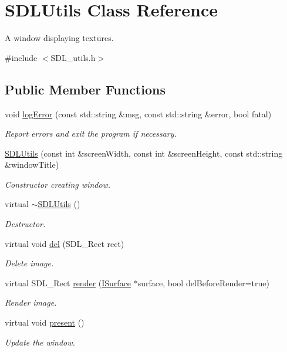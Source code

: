 \hypertarget{class_s_d_l_utils}{}\section{S\+D\+L\+Utils Class Reference}
\label{class_s_d_l_utils}


A window displaying textures.  




{\ttfamily \#include $<$S\+D\+L\+\_\+utils.\+h$>$}

\subsection*{Public Member Functions}
\begin{DoxyCompactItemize}
\item 
void \mbox{\hyperlink{class_s_d_l_utils_ad74f19327d940a7fea1a8178d81768e7}{log\+Error}} (const std\+::string \&msg, const std\+::string \&error, bool fatal)
\begin{DoxyCompactList}\small\item\em Report errors and exit the program if necessary. \end{DoxyCompactList}\item 
\mbox{\hyperlink{class_s_d_l_utils_a53e5b8a0018c3d96af3ad413b2272f3d}{S\+D\+L\+Utils}} (const int \&screen\+Width, const int \&screen\+Height, const std\+::string \&window\+Title)
\begin{DoxyCompactList}\small\item\em Constructor creating window. \end{DoxyCompactList}\item 
virtual \mbox{\hyperlink{class_s_d_l_utils_a4530f05f7fdf2495a63ff1e9fc553680}{$\sim$\+S\+D\+L\+Utils}} ()
\begin{DoxyCompactList}\small\item\em Destructor. \end{DoxyCompactList}\item 
virtual void \mbox{\hyperlink{class_s_d_l_utils_a8dfdc8f41938c2c53ac5121c10eb1638}{del}} (S\+D\+L\+\_\+\+Rect rect)
\begin{DoxyCompactList}\small\item\em Delete image. \end{DoxyCompactList}\item 
virtual S\+D\+L\+\_\+\+Rect \mbox{\hyperlink{class_s_d_l_utils_a5b0a6dd7f5f0b8bd7a06527c39d8a666}{render}} (\mbox{\hyperlink{class_i_surface}{I\+Surface}} $\ast$surface, bool del\+Before\+Render=true)
\begin{DoxyCompactList}\small\item\em Render image. \end{DoxyCompactList}\item 
virtual void \mbox{\hyperlink{class_s_d_l_utils_a0e9c4b007ae61772a1c41592877b30ab}{present}} ()
\begin{DoxyCompactList}\small\item\em Update the window. \end{DoxyCompactList}\end{DoxyCompactItemize}


